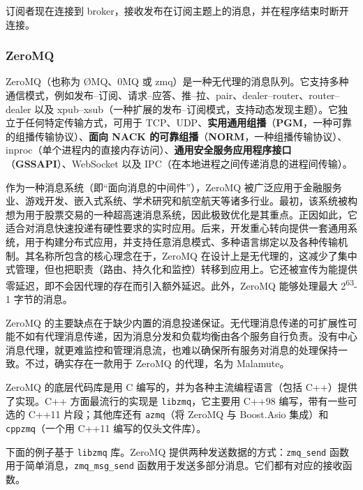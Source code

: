 订阅者现在连接到 broker，接收发布在订阅主题上的消息，并在程序结束时断开连接。

\subsubsection{ZeroMQ}

\label{idx:1523}
\label{idx:1524}
\label{idx:1525}
\label{idx:1526}
\label{idx:1527}
ZeroMQ（也称为 ØMQ、0MQ 或 zmq）是一种无代理的消息队列。它支持多种通信模式，例如发布–订阅、请求–应答、推–拉、pair、dealer–router、router–dealer 以及 xpub–xsub（一种扩展的发布–订阅模式，支持动态发现主题）。它独立于任何特定传输方式，可用于 TCP、UDP、\textbf{实用通用组播}（\textbf{PGM}，一种可靠的组播传输协议）、\textbf{面向 NACK 的可靠组播}（\textbf{NORM}，一种组播传输协议）、inproc（单个进程内的直接内存访问）、\textbf{通用安全服务应用程序接口}（\textbf{GSSAPI}）、WebSocket 以及 IPC（在本地进程之间传递消息的进程间传输）。


\label{idx:1528}
作为一种消息系统（即“面向消息的中间件”），ZeroMQ 被广泛应用于金融服务业、游戏开发、嵌入式系统、学术研究和航空航天等诸多行业。最初，该系统被构想为用于股票交易的一种超高速消息系统，因此极致优化是其重点。正因如此，它适合对消息快速投递有硬性要求的实时应用。后来，开发重心转向提供一套通用系统，用于构建分布式应用，并支持任意消息模式、多种语言绑定以及各种传输机制。其名称所包含的核心理念在于，ZeroMQ 在设计上是无代理的，这减少了集中式管理，但也把职责（路由、持久化和监控）转移到应用上。它还被宣传为能提供零延迟，即不会因代理的存在而引入额外延迟。此外，ZeroMQ 能够处理最大 2\textsuperscript{63}-1 字节的消息。

\label{idx:1529}
\label{idx:1530}
ZeroMQ 的主要缺点在于缺少内置的消息投递保证。无代理消息传递的可扩展性可能不如有代理消息传递，因为消息分发和负载均衡由各个服务自行负责。没有中心消息代理，就更难监控和管理消息流，也难以确保所有服务对消息的处理保持一致。不过，确实存在一款用于 ZeroMQ 的代理，名为 Malamute。

ZeroMQ 的底层代码库是用 C 编写的，并为各种主流编程语言（包括 C++）提供了实现。C++ 方面最流行的实现是 \texttt{libzmq}，它主要用 C++98 编写，带有一些可选的 C++11 片段；其他库还有 \texttt{azmq}（将 ZeroMQ 与 Boost.Asio 集成）和 \texttt{cppzmq}（一个用 C++11 编写的仅头文件库）。

下面的例子基于 \texttt{libzmq} 库。ZeroMQ 提供两种发送数据的方式：\texttt{zmq\_send} 函数用于简单消息，\texttt{zmq\_\allowbreak{}msg\_\allowbreak{}send} 函数用于发送多部分消息。它们都有对应的接收函数。

